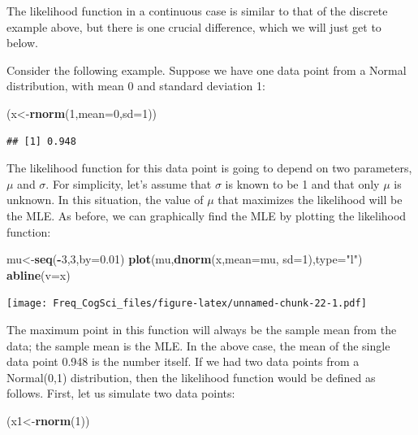 \documentclass[12pt,]{krantz}
\newenvironment{Shaded}{\begin{snugshade}}{\end{snugshade}}
\newcommand{\DataTypeTok}[1]{\textcolor[rgb]{0.13,0.29,0.53}{#1}}
\newcommand{\DecValTok}[1]{\textcolor[rgb]{0.00,0.00,0.81}{#1}}
\newcommand{\FloatTok}[1]{\textcolor[rgb]{0.00,0.00,0.81}{#1}}
\newcommand{\KeywordTok}[1]{\textcolor[rgb]{0.13,0.29,0.53}{\textbf{#1}}}
\newcommand{\NormalTok}[1]{#1}
\newcommand{\OperatorTok}[1]{\textcolor[rgb]{0.81,0.36,0.00}{\textbf{#1}}}
\newcommand{\StringTok}[1]{\textcolor[rgb]{0.31,0.60,0.02}{#1}}
\begin{document}
The likelihood function in a continuous case is similar to that of the discrete example above, but there is one crucial difference, which we will just get to below.

Consider the following example. Suppose we have one data point from a Normal distribution, with mean 0 and standard deviation 1:

\begin{Shaded}
\begin{Highlighting}[]
\NormalTok{(x<-}\KeywordTok{rnorm}\NormalTok{(}\DecValTok{1}\NormalTok{,}\DataTypeTok{mean=}\DecValTok{0}\NormalTok{,}\DataTypeTok{sd=}\DecValTok{1}\NormalTok{))}
\end{Highlighting}
\end{Shaded}

\begin{verbatim}
## [1] 0.948
\end{verbatim}

The likelihood function for this data point is going to depend on two parameters, \(\mu\) and \(\sigma\). For simplicity, let's assume that \(\sigma\) is known to be 1 and that only \(\mu\) is unknown. In this situation, the value of \(\mu\) that maximizes the likelihood will be the MLE. As before, we can graphically find the MLE by plotting the likelihood function:

\begin{Shaded}
\begin{Highlighting}[]
\NormalTok{mu<-}\KeywordTok{seq}\NormalTok{(}\OperatorTok{-}\DecValTok{3}\NormalTok{,}\DecValTok{3}\NormalTok{,}\DataTypeTok{by=}\FloatTok{0.01}\NormalTok{)}
\KeywordTok{plot}\NormalTok{(mu,}\KeywordTok{dnorm}\NormalTok{(x,}\DataTypeTok{mean=}\NormalTok{mu,}
              \DataTypeTok{sd=}\DecValTok{1}\NormalTok{),}\DataTypeTok{type=}\StringTok{"l"}\NormalTok{)}
\KeywordTok{abline}\NormalTok{(}\DataTypeTok{v=}\NormalTok{x)}
\end{Highlighting}
\end{Shaded}

\texttt{[image: Freq\_CogSci\_files/figure-latex/unnamed-chunk-22-1.pdf]}

The maximum point in this function will always be the sample mean from the data; the sample mean is the MLE. In the above case, the mean of the single data point 0.948 is the number itself. If we had two data points from a Normal(0,1) distribution, then the likelihood function would be defined as follows. First, let us simulate two data points:

\begin{Shaded}
\begin{Highlighting}[]
\NormalTok{(x1<-}\KeywordTok{rnorm}\NormalTok{(}\DecValTok{1}\NormalTok{))}
\end{Highlighting}
\end{Shaded}
\end{document}
